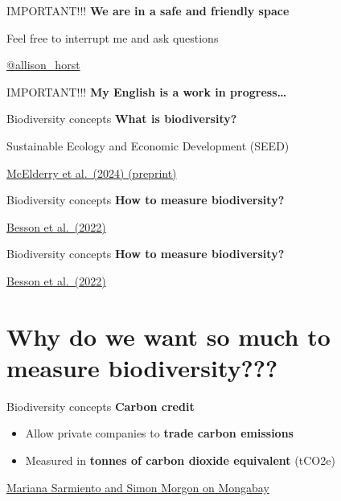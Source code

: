 \documentclass[
  ignorenonframetext,
]{beamer}
\providecommand{\tightlist}{%
  \setlength{\itemsep}{0pt}\setlength{\parskip}{0pt}}\usepackage{longtable,booktabs,array}
\begin{document}
\begin{frame}{IMPORTANT!!!}
\label{important}
\textbf{We are in a safe and friendly space}

Feel free to interrupt me and ask questions

\href{https://twitter.com/allison_horst}{@allison\_horst}
\end{frame}

\begin{frame}{IMPORTANT!!!}
\label{important-1}
\textbf{My English is a work in progress\ldots{}}
\end{frame}

\begin{frame}{Biodiversity concepts}
\label{biodiversity-concepts}
\textbf{What is biodiversity?}

Sustainable Ecology and Economic Development (SEED)

\href{https://doi.org/10.32942/X2689N}{McElderry et al.~(2024)
(preprint)}
\end{frame}

\begin{frame}{Biodiversity concepts}
\label{biodiversity-concepts-1}
\textbf{How to measure biodiversity?}

\href{https://doi.org/10.1111/ele.14123}{Besson et al.~(2022)}
\end{frame}

\begin{frame}{Biodiversity concepts}
\label{biodiversity-concepts-2}
\textbf{How to measure biodiversity?}

\href{https://doi.org/10.1111/ele.14123}{Besson et al.~(2022)}
\end{frame}

\section{Why do we want so much to measure
biodiversity???}\label{why-do-we-want-so-much-to-measure-biodiversity}

\begin{frame}{Biodiversity concepts}
\label{biodiversity-concepts-3}
\textbf{Carbon credit}

\begin{itemize}
\tightlist
\item
  Allow private companies to \textbf{trade carbon emissions}
\item
  Measured in \textbf{tonnes of carbon dioxide equivalent} (tCO2e)
\end{itemize}

\href{https://news.mongabay.com/2023/02/biodiversity-credits-an-opportunity-to-create-a-new-crediting-framework-commentary/}{Mariana
Sarmiento and Simon Morgon on Mongabay}
\end{frame}
\end{document}
